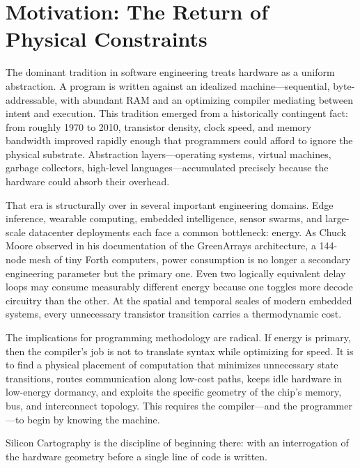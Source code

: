 \documentclass[11pt, a4paper]{article}
\begin{document}
\newpage

\tableofcontents
\newpage

\section{Motivation: The Return of Physical Constraints}

The dominant tradition in software engineering treats hardware as a uniform abstraction.
A program is written against an idealized machine---sequential, byte-addressable,
with abundant RAM and an optimizing compiler mediating between intent and execution.
This tradition emerged from a historically contingent fact: from roughly 1970 to 2010,
transistor density, clock speed, and memory bandwidth improved rapidly enough that
programmers could afford to ignore the physical substrate. Abstraction layers---operating
systems, virtual machines, garbage collectors, high-level languages---accumulated precisely
because the hardware could absorb their overhead.

That era is structurally over in several important engineering domains. Edge inference,
wearable computing, embedded intelligence, sensor swarms, and large-scale datacenter
deployments each face a common bottleneck: energy. As Chuck Moore observed in his
documentation of the GreenArrays architecture, a 144-node mesh of tiny Forth computers,
power consumption is no longer a secondary engineering parameter but the primary one.
Even two logically equivalent delay loops may consume measurably different energy because
one toggles more decode circuitry than the other. At the spatial and temporal scales of
modern embedded systems, every unnecessary transistor transition carries a thermodynamic cost.

The implications for programming methodology are radical. If energy is primary, then the
compiler's job is not to translate syntax while optimizing for speed. It is to find a
physical placement of computation that minimizes unnecessary state transitions, routes
communication along low-cost paths, keeps idle hardware in low-energy dormancy, and
exploits the specific geometry of the chip's memory, bus, and interconnect topology.
This requires the compiler---and the programmer---to begin by knowing the machine.

Silicon Cartography is the discipline of beginning there: with an interrogation of the
hardware geometry before a single line of code is written.
\end{document}
